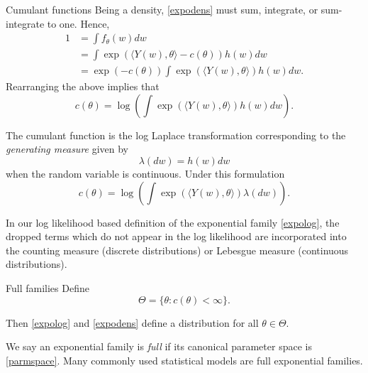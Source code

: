 \documentclass[
  ignorenonframetext,
]{beamer}
\begin{document}
\begin{frame}{Cumulant functions}
\protect\hypertarget{cumulant-functions}{}
Being a density, \eqref{expodens} must sum, integrate, or sum-integrate
to one. Hence, \begin{align*}
    1 &= \int f_\theta(w) dw \\ 
      &= \int \exp\left(\langle Y(w),\theta\rangle - c(\theta)\right) h(w)dw \\
      &= \exp\left(-c(\theta)\right) \int \exp\left(\langle Y(w),\theta\rangle\right) h(w) dw.
\end{align*} Rearranging the above implies that \[
  c(\theta) = \log\left(\int \exp\left(\langle Y(w),\theta\rangle\right) h(w) dw\right).
\]
\end{frame}

\begin{frame}{}
\protect\hypertarget{section}{}
The cumulant function is the log Laplace transformation corresponding to
the \emph{generating measure} given by \[
  \lambda(dw) = h(w)dw
\] when the random variable is continuous. Under this formulation \[
  c(\theta) = \log\left(\int \exp\left(\langle Y(w),\theta\rangle\right) \lambda(dw)\right).
\]

In our log likelihood based definition of the exponential family
\eqref{expolog}, the dropped terms which do not appear in the log
likelihood are incorporated into the counting measure (discrete
distributions) or Lebesgue measure (continuous distributions).
\end{frame}

\begin{frame}{Full families}
\protect\hypertarget{full-families}{}
Define \begin{equation} \label{parmspace}
  \Theta = \{ \theta : c(\theta) < \infty \}    .
\end{equation}

Then \eqref{expolog} and \eqref{expodens} define a distribution for all
\(\theta \in \Theta\).

We say an exponential family is \emph{full} if its canonical parameter
space is \eqref{parmspace}. Many commonly used statistical models are
full exponential families.
\end{frame}
\end{document}
